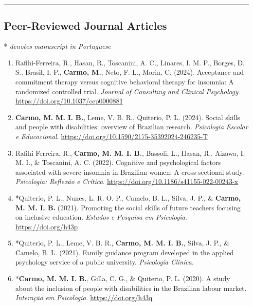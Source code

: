 \documentclass[10pt,]{article}
\begin{document}
\hrule

\subsection{\texorpdfstring{\textbf{Peer-Reviewed Journal
Articles}}{Peer-Reviewed Journal Articles}}\label{peer-reviewed-journal-articles}

* \emph{denotes manuscript in Portuguese}

\begin{enumerate}
\def\labelenumi{\arabic{enumi}.}
\item
  Rafihi-Ferreira, R., Hasan, R., Toscanini, A. C., Linares, I. M. P.,
  Borges, D. S., Brasil, I. P., \textbf{Carmo, M.}, Neto, F. L., Morin,
  C. (2024). Acceptance and commitment therapy versus cognitive
  behavioral therapy for insomnia: A randomized controlled trial.
  \emph{Journal of Consulting and Clinical Psychology}.
  \url{https://doi.org/10.1037/ccp0000881}
\item
  \textbf{Carmo, M. M. I. B.}, Leme, V. B. R., Quiterio, P. L. (2024).
  Social skills and people with disabilities: overview of Brazilian
  research. \emph{Psicologia Escolar e Educacional}.
  \url{https://doi.org/10.1590/2175-35392024-246235-T}
\item
  Rafihi-Ferreira, R., \textbf{Carmo, M. M. I. B.}, Bassoli, L., Hasan,
  R., Aizawa, I. M. I., \& Toscanini, A. C. (2022). Cognitive and
  psychological factors associated with severe insomnia in Brazilian
  women: A cross-sectional study. \emph{Psicologia: Reflexão e Crítica}.
  \url{https://doi.org/10.1186/s41155-022-00243-x}
\item
  *Quiterio, P. L., Nunes, L. R. O. P., Camelo, B. L., Silva, J. P., \&
  \textbf{Carmo, M. M. I. B.} (2021). Promoting the social skills of
  future teachers focusing on inclusive education. \emph{Estudos e
  Pesquisa em Psicologia}. \url{https://doi.org/h43p}
\item
  *Quiterio, P. L., Leme, V. B. R., \textbf{Carmo, M. M. I. B.}, Silva,
  J. P., \& Camelo, B. L. (2021). Family guidance program developed in
  the applied psychology service of a public university.
  \emph{Psicologia Clínica}.
\item
  *\textbf{Carmo, M. M. I. B.}, Gilla, C. G., \& Quiterio, P. L. (2020).
  A study about the inclusion of people with disabilities in the
  Brazilian labour market. \emph{Interação em Psicologia}.
  \url{https://doi.org/h43q}
\end{enumerate}
\end{document}
